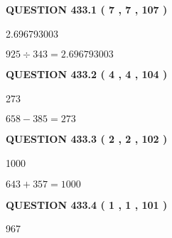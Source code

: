\documentclass{ctexart}
\begin{document}
\vspace{0.2in}
  
{\textbf{\Large{QUESTION
433.1 
 ( 7 , 7 , 107 )
}}}
  
  
 
 
\noindent{}

2.696793003
 
 
 
 
\noindent{}

$ %
925 \div  %
343=   %
2.696793003$
 
 
  
\vspace{0.2in}
  
{\textbf{\Large{QUESTION
433.2 
 ( 4 , 4 , 104 )
}}}
  
  
 
 
\noindent{}

273
 
 
 
 
\noindent{}

$ %
658 -  %
385=   %
273$
 
 
  
\vspace{0.2in}
  
{\textbf{\Large{QUESTION
433.3 
 ( 2 , 2 , 102 )
}}}
  
  
 
 
\noindent{}

1000
 
 
 
 
\noindent{}

$ %
643 +  %
357=   %
1000$
 
 
  
\vspace{0.2in}
  
{\textbf{\Large{QUESTION
433.4 
 ( 1 , 1 , 101 )
}}}
  
  
 
 
\noindent{}

967
 
 
 
\end{document}
